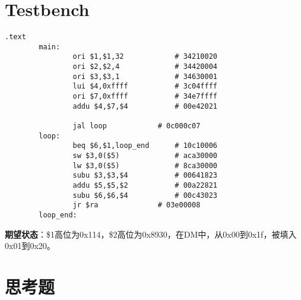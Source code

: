 \documentclass[UTF8]{ctexart}
\begin{document}
\section{Testbench}
\begin{center}
	\begin{lstlisting}[style={mips-style}]
				.text
		main:
				ori $1,$1,32 			# 34210020
				ori $2,$2,4 			# 34420004
				ori $3,$3,1 			# 34630001
				lui $4,0xffff			# 3c04ffff
				ori $7,0xffff			# 34e7ffff
				addu $4,$7,$4			# 00e42021
		
				jal loop			# 0c000c07
		loop:
				beq $6,$1,loop_end		# 10c10006
				sw $3,0($5) 			# aca30000
				lw $3,0($5) 			# 8ca30000
				subu $3,$3,$4 			# 00641823
				addu $5,$5,$2 			# 00a22821
				subu $6,$6,$4 			# 00c43023
				jr $ra				# 03e00008
		loop_end:
\end{lstlisting}
\end{center}
\vspace{2ex}
\indent \textbf{期望状态}：\$1高位为0x114，\$2高位为0x8930，在DM中，从0x00到0x1f，被填入0x01到0x20。
\newpage
\section{思考题}
\end{document}

